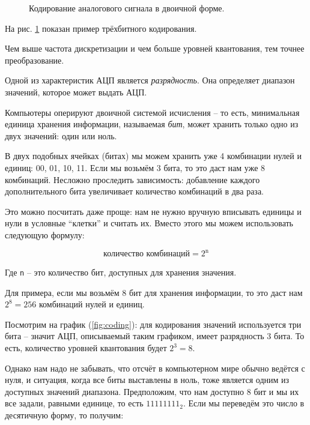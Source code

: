 \documentclass[../sparc.tex]{subfiles}
\begin{document}
\begin{enumerate}
\begin{figure}[h]
    \caption{Кодирование аналогового сигнала в двоичной форме.}
    \label{fig:encoding}
  \end{figure}

  На рис. \ref{fig:encoding} показан пример трёхбитного кодирования.

  Чем выше частота дискретизации и чем больше уровней квантования, тем точнее
  преобразование.

\end{enumerate}

Одной из характеристик АЦП является \emph{разрядность}.  Она определяет диапазон
значений, которое может выдать АЦП.

Компьютеры оперируют двоичной системой исчисления -- то есть, минимальная единица
хранения информации, называемая \emph{бит}, может хранить только одно из двух
значений: один или ноль.

В двух подобных ячейках (битах) мы можем хранить уже 4 комбинации нулей и
единиц: 00, 01, 10, 11.  Если мы возьмём 3 бита, то это даст нам уже 8
комбинаций.  Несложно проследить зависимость: добавление каждого дополнительного
бита увеличивает количество комбинаций в два раза.

Это можно посчитать даже проще: нам не нужно вручную вписывать единицы и нули в
условные ``клетки'' и считать их.  Вместо этого мы можем использовать следующую
формулу:

\begin{equation}
  \mbox{количество комбинаций} = 2^{\mbox{n}}
\end{equation}

Где \texttt{n} -- это количество бит, доступных для хранения значения.

Для примера, если мы возьмём 8 бит для хранения информации, то это даст нам $2^8
= 256$ комбинаций нулей и единиц.

Посмотрим на график (\ref{fig:coding}): для кодирования значений используется
три бита -- значит АЦП, описываемый таким графиком, имеет разрядность 3 бита.  То
есть, количество уровней квантования будет $2^3 = 8$.

Однако нам надо не забывать, что отсчёт в компьютерном мире обычно ведётся с
нуля, и ситуация, когда все биты выставлены в ноль, тоже является одним из
доступных значений диапазона.  Предположим, что нам доступно 8 бит и мы их все
задали, равными единице, то есть $11111111_2$.  Если мы переведём это число в
десятичную форму, то получим:
\end{document}
